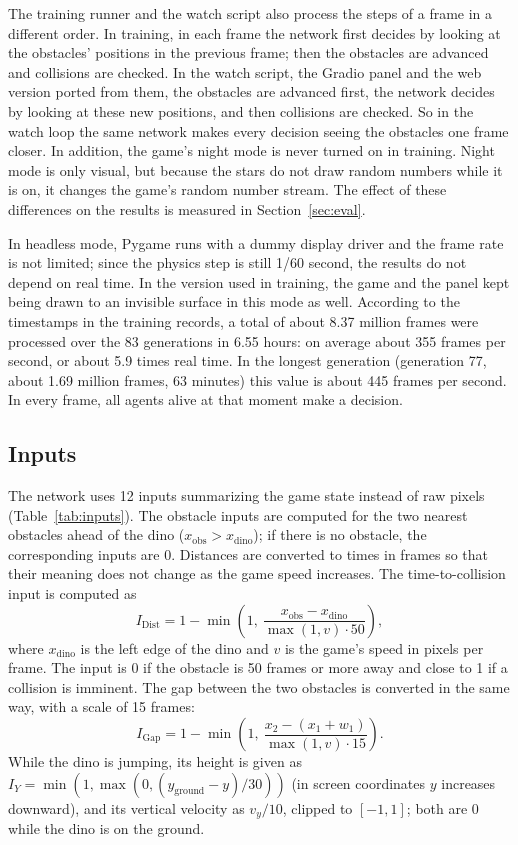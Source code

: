 \documentclass[11pt,a4paper]{article}
\begin{document}
The training runner and the watch script also process the steps of a frame in a different order. In training, in each frame the network first decides by looking at the obstacles' positions in the previous frame; then the obstacles are advanced and collisions are checked. In the watch script, the Gradio panel and the web version ported from them, the obstacles are advanced first, the network decides by looking at these new positions, and then collisions are checked. So in the watch loop the same network makes every decision seeing the obstacles one frame closer. In addition, the game's night mode is never turned on in training. Night mode is only visual, but because the stars do not draw random numbers while it is on, it changes the game's random number stream. The effect of these differences on the results is measured in Section~\ref{sec:eval}.

In headless mode, Pygame runs with a dummy display driver and the frame rate is not limited; since the physics step is still 1/60 second, the results do not depend on real time. In the version used in training, the game and the panel kept being drawn to an invisible surface in this mode as well. According to the timestamps in the training records, a total of about 8.37 million frames were processed over the 83 generations in 6.55 hours: on average about 355 frames per second, or about 5.9 times real time. In the longest generation (generation 77, about 1.69 million frames, 63 minutes) this value is about 445 frames per second. In every frame, all agents alive at that moment make a decision.

\subsection{Inputs}

The network uses 12 inputs summarizing the game state instead of raw pixels (Table~\ref{tab:inputs}). The obstacle inputs are computed for the two nearest obstacles ahead of the dino ($x_{\mathrm{obs}} > x_{\mathrm{dino}}$); if there is no obstacle, the corresponding inputs are 0. Distances are converted to times in frames so that their meaning does not change as the game speed increases. The time-to-collision input is computed as
\begin{equation}
  I_{\mathrm{Dist}} = 1 - \min\!\left(1,\ \frac{x_{\mathrm{obs}} - x_{\mathrm{dino}}}{\max(1, v)\cdot 50}\right),
  \label{eq:tti}
\end{equation}
where $x_{\mathrm{dino}}$ is the left edge of the dino and $v$ is the game's speed in pixels per frame. The input is 0 if the obstacle is 50 frames or more away and close to 1 if a collision is imminent. The gap between the two obstacles is converted in the same way, with a scale of 15 frames:
\begin{equation}
  I_{\mathrm{Gap}} = 1 - \min\!\left(1,\ \frac{x_{2} - (x_{1} + w_{1})}{\max(1, v)\cdot 15}\right).
  \label{eq:gap}
\end{equation}
While the dino is jumping, its height is given as $I_{Y} = \min\!\left(1, \max\!\left(0, (y_{\mathrm{ground}} - y)/30\right)\right)$ (in screen coordinates $y$ increases downward), and its vertical velocity as $v_y/10$, clipped to $[-1, 1]$; both are 0 while the dino is on the ground.
\end{document}
